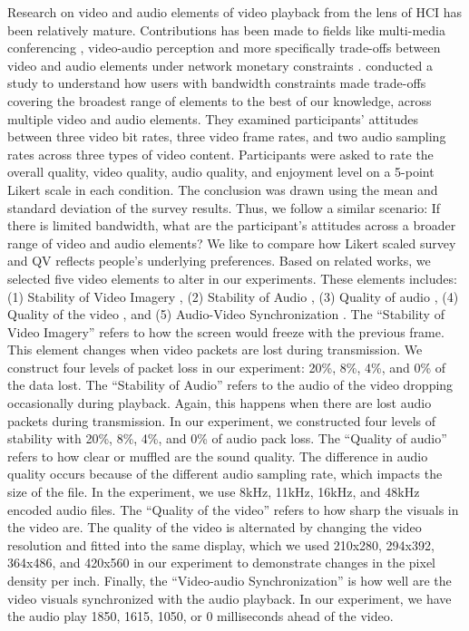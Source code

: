 Research on video and audio elements of video playback from the lens of HCI has been relatively mature.
Contributions has been made to fields like multi-media conferencing \cite{watson1996evaluating}, video-audio perception \cite{chen2006cognitive, molnar2015assessing}and more specifically trade-offs between video and audio elements under network monetary constraints \cite{molnar2013comedy, oeldorf2012bad}.
\textcite{oeldorf2012bad} conducted a study to understand how users with bandwidth constraints made trade-offs covering the broadest range of elements to the best of our knowledge, across multiple video and audio elements. 
They examined participants' attitudes between three video bit rates, three video frame rates, and two audio sampling rates across three types of video content.
Participants were asked to rate the overall quality, video quality, audio quality, and enjoyment level on a 5-point Likert scale in each condition. 
The conclusion was drawn using the mean and standard deviation of the survey results.
Thus, we follow a similar scenario: 
If there is limited bandwidth, what are the participant's attitudes across a broader range of video and audio elements?
We like to compare how Likert scaled survey and QV reflects people's underlying preferences. 
Based on related works, we selected five video elements to alter in our experiments. 
These elements includes: (1) Stability of Video Imagery \cite{claypool1999effects}, (2) Stability of Audio \cite{claypool1999effects}, (3) Quality of audio \cite{oeldorf2012bad, noll1993wideband}, (4) Quality of the video \cite{oeldorf2012bad, knoche2008low}, and (5) Audio-Video Synchronization \cite{steinmetz1996human}. 
The ``Stability of Video Imagery'' refers to how the screen would freeze with the previous frame. 
This element changes when video packets are lost during transmission. 
We construct four levels of packet loss in our experiment: 20\%, 8\%, 4\%, and 0\% of the data lost. 
The ``Stability of Audio'' refers to the audio of the video dropping occasionally during playback. 
Again, this happens when there are lost audio packets during transmission. 
In our experiment, we constructed four levels of stability with 20\%, 8\%, 4\%, and 0\% of audio pack loss. 
The ``Quality of audio'' refers to how clear or muffled are the sound quality. 
The difference in audio quality occurs because of the different audio sampling rate, which impacts the size of the file. 
In the experiment, we use 8kHz, 11kHz, 16kHz, and 48kHz encoded audio files. 
The ``Quality of the video'' refers to how sharp the visuals in the video are.
The quality of the video is alternated by changing the video resolution and fitted into the same display, which we used 210x280, 294x392, 364x486, and 420x560 in our experiment to demonstrate changes in the pixel density per inch.
Finally, the ``Video-audio Synchronization'' is how well are the video visuals synchronized with the audio playback.
In our experiment, we have the audio play 1850, 1615, 1050, or 0 milliseconds ahead of the video.

